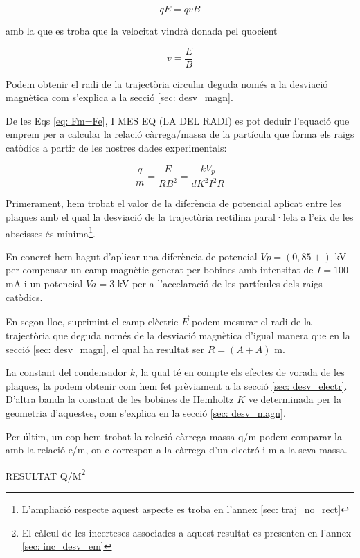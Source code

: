 \documentclass[11pt]{article}
\begin{document}
\begin{equation}\label{eq: Fm=Fe}
    qE = qvB
\end{equation}

amb la que es troba que la velocitat vindrà donada pel quocient

\begin{equation}
    v = \frac{E}{B}
\end{equation}

Podem obtenir el radi de la trajectòria circular deguda només a la desviació magnètica com s'explica a la secció \ref{sec: desv_magn}.

De les Eqs \eqref{eq: Fm=Fe}, I MES EQ (LA DEL RADI) es pot deduir l'equació que emprem per a calcular la relació càrrega/massa de la partícula que forma els raigs catòdics a partir de les nostres dades experimentals:

\begin{equation}
    \frac{q}{m}=\frac{E}{RB^2}=\frac{kV_p}{dK^2I^2R}
\end{equation}

Primerament, hem trobat el valor de la diferència de potencial aplicat entre les plaques amb el qual la desviació de la trajectòria rectilina paral·lela a l'eix de les abscisses és mínima\footnote{L'ampliació respecte aquest aspecte es troba en l'annex \ref{sec: traj_no_rect}}. 

En concret hem hagut d'aplicar una diferència de potencial $Vp = (0,85 + )$ kV per compensar un camp magnètic generat per bobines amb intensitat de $I = 100$ mA i un potencial $Va = 3$ kV per a l'accelaració de les partícules dels raigs catòdics.

En segon lloc, suprimint el camp elèctric $\vec{E}$ podem mesurar el radi de la trajectòria que deguda només de la desviació magnètica d'igual manera que en la secció \ref{sec: desv_magn}, el qual ha resultat ser $R = (A + A)$ m.

La constant del condensador $k$, la qual té en compte els efectes de vorada de les plaques, la podem obtenir com hem fet prèviament a la secció \ref{sec: desv_electr}. D'altra banda la constant de les bobines de Hemholtz $K$ ve determinada per la geometria d'aquestes, com s'explica en la secció \ref{sec: desv_magn}.

Per últim, un cop hem trobat la relació càrrega-massa q/m podem comparar-la amb la relació e/m, on e correspon a la càrrega d'un electró i m a la seva massa.

RESULTAT Q/M\footnote{El càlcul de les incerteses associades a aquest resultat es presenten en l'annex \ref{sec: inc_desv_em}}
\end{document}
